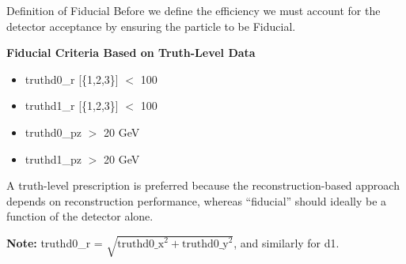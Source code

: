 \begin{frame}{Definition of Fiducial}
    Before we define the efficiency we must account for the detector acceptance by ensuring the particle to be Fiducial.

    \vspace{0.5cm}
		\textbf{Fiducial Criteria Based on Truth-Level Data}
		\begin{itemize}
			\item truthd0\_r [\{1,2,3\}] $<$ 100
			\item truthd1\_r [\{1,2,3\}] $<$ 100
			\item truthd0\_pz $>$ 20 GeV
			\item truthd1\_pz $>$ 20 GeV	
		\end{itemize}

        \vspace{0.3cm}
        {\small
        A truth-level prescription is preferred because the reconstruction-based approach depends on reconstruction performance, whereas ``fiducial'' should ideally be a function of the detector alone.}

        \vspace{0.2cm}

        {\scriptsize
            \textbf{Note:} truthd0\_r = $\sqrt{\text{truthd0\_x}^2 + \text{truthd0\_y}^2}$, and similarly for d1.

        }
\end{frame}

